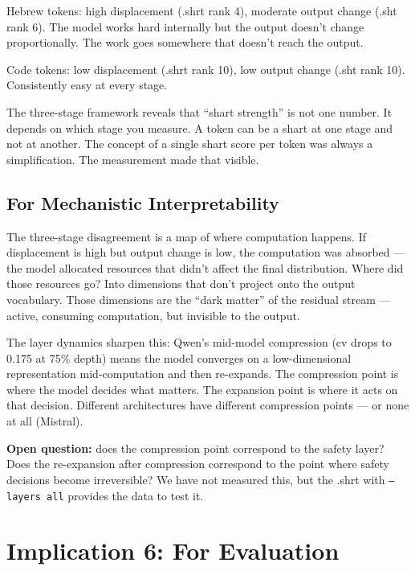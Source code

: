 \documentclass[11pt,a4paper]{article}
\begin{document}
Hebrew tokens: high displacement (.shrt rank 4), moderate output change (.sht rank 6). The model works hard internally but the output doesn't change proportionally. The work goes somewhere that doesn't reach the output.

Code tokens: low displacement (.shrt rank 10), low output change (.sht rank 10). Consistently easy at every stage.

The three-stage framework reveals that ``shart strength'' is not one number. It depends on which stage you measure. A token can be a shart at one stage and not at another. The concept of a single shart score per token was always a simplification. The measurement made that visible.

\subsection{For Mechanistic Interpretability}

The three-stage disagreement is a map of where computation happens. If displacement is high but output change is low, the computation was absorbed --- the model allocated resources that didn't affect the final distribution. Where did those resources go? Into dimensions that don't project onto the output vocabulary. Those dimensions are the ``dark matter'' of the residual stream --- active, consuming computation, but invisible to the output.

The layer dynamics sharpen this: Qwen's mid-model compression (cv drops to 0.175 at 75\% depth) means the model converges on a low-dimensional representation mid-computation and then re-expands. The compression point is where the model decides what matters. The expansion point is where it acts on that decision. Different architectures have different compression points --- or none at all (Mistral).

\textbf{Open question:} does the compression point correspond to the safety layer? Does the re-expansion after compression correspond to the point where safety decisions become irreversible? We have not measured this, but the .shrt with \texttt{--layers all} provides the data to test it.

\section{Implication 6: For Evaluation}
\end{document}
